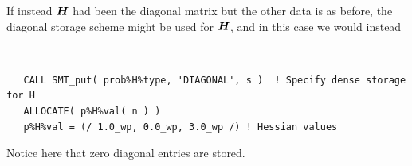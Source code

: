 \documentclass{galahad}
\begin{document}
If instead ${\bm{H}}$ had been the diagonal matrix
but the other data is as before, the diagonal storage scheme 
might be used for ${\bm{H}}$, and in this case we would instead 
{\tt \small
\begin{verbatim}
   CALL SMT_put( prob%H%type, 'DIAGONAL', s )  ! Specify dense storage for H
   ALLOCATE( p%H%val( n ) )
   p%H%val = (/ 1.0_wp, 0.0_wp, 3.0_wp /) ! Hessian values
\end{verbatim}
}
\noindent
Notice here that zero diagonal entries are stored.
\end{document}
